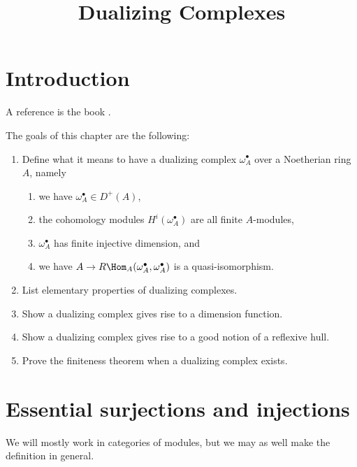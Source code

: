 

%


\title{Dualizing Complexes}


\maketitle

\label{section-phantom}

\tableofcontents

\section{Introduction}
\label{section-introduction}

\noindent
A reference is the book \cite{RD}.

\medskip\noindent
The goals of this chapter are the following:
\begin{enumerate}
\item Define what it means to have a dualizing complex $\omega_A^\bullet$
over a Noetherian ring $A$, namely
\begin{enumerate}
\item we have $\omega_A^\bullet \in D^{+}(A)$,
\item the cohomology modules $H^i(\omega_A^\bullet)$ are
all finite $A$-modules,
\item $\omega_A^\bullet$ has finite injective dimension, and
\item we have $A \to R\Hom_A(\omega_A^\bullet, \omega_A^\bullet)$
is a quasi-isomorphism.
\end{enumerate}
\item List elementary properties of dualizing complexes.
\item Show a dualizing complex gives rise to a dimension function.
\item Show a dualizing complex gives rise to a good notion of a
reflexive hull.
\item Prove the finiteness theorem when a dualizing complex exists.
\end{enumerate}






\section{Essential surjections and injections}
\label{section-essential}

\noindent
We will mostly work in categories of modules, but we may as well make
the definition in general.


